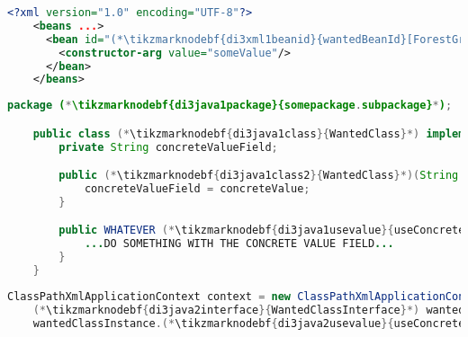 \begin{lstlisting}[language=XML, title={Configuration XML}]
    <?xml version="1.0" encoding="UTF-8"?>
    <beans ...>
      <bean id="(*\tikzmarknodebf{di3xml1beanid}{wantedBeanId}[ForestGreen]*)" class="(*\tikzmarknodebf{di3xml1package}{somepackage.subpackage}[ForestGreen]*).(*\tikzmarknodebf{di3xml1class}{WantedClass}[ForestGreen]*)">
        <constructor-arg value="someValue"/>
      </bean>
    </beans>
\end{lstlisting}
\begin{lstlisting}[language=Java, title={Wanted class with the constructor}]
    package (*\tikzmarknodebf{di3java1package}{somepackage.subpackage}*);

    public class (*\tikzmarknodebf{di3java1class}{WantedClass}*) implements (*\tikzmarknodebf{di3java1interface}{WantedClassInterface}*) {
        private String concreteValueField;

        public (*\tikzmarknodebf{di3java1class2}{WantedClass}*)(String concreteValue) {
            concreteValueField = concreteValue;
        }

        public WHATEVER (*\tikzmarknodebf{di3java1usevalue}{useConcreteValue}*)() {
            ...DO SOMETHING WITH THE CONCRETE VALUE FIELD...
        }
    }
\end{lstlisting}
\begin{lstlisting}[language=Java, title={Usage}]
    ClassPathXmlApplicationContext context = new ClassPathXmlApplicationContext("configurationFile.xml");
    (*\tikzmarknodebf{di3java2interface}{WantedClassInterface}*) wantedClassInstance = context.getBean("(*\tikzmarknodebf{di3java2beanid}{wantedBeanId}[ForestGreen]*)", (*\tikzmarknodebf{di3java2interface2}{WantedClassInterface}*).class);
    wantedClassInstance.(*\tikzmarknodebf{di3java2usevalue}{useConcreteValue}*)();
\end{lstlisting}
\newpage

